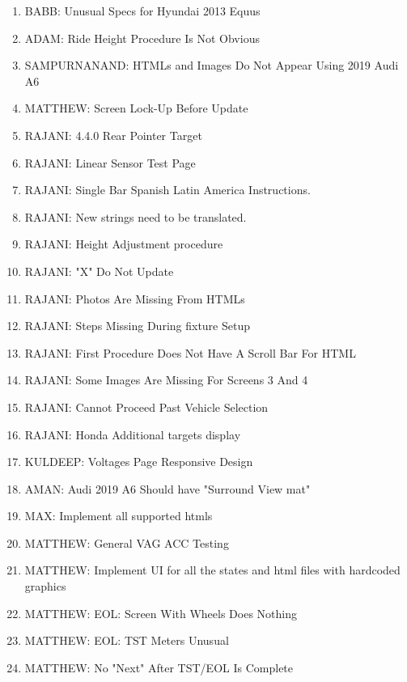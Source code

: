 \normalsize
\begin{enumerate}[leftmargin=!,labelindent=5pt,itemindent=-35pt]
\item {} BABB: Unusual Specs for Hyundai 2013 Equus
\item {} ADAM: Ride Height Procedure Is Not Obvious
\item {} SAMPURNANAND: HTMLs and Images Do Not Appear Using 2019 Audi A6
\item {} MATTHEW: Screen Lock-Up Before Update
\item {} RAJANI: 4.4.0 Rear Pointer Target
\item {} RAJANI: Linear Sensor Test Page
\item {} RAJANI: Single Bar Spanish Latin America Instructions.
\item {} RAJANI: New strings need to be translated.
\item {} RAJANI: Height Adjustment procedure
\item {} RAJANI: "X" Do Not Update
\item {} RAJANI: Photos Are Missing From HTMLs
\item {} RAJANI: Steps Missing During fixture Setup
\item {} RAJANI: First Procedure Does Not Have A Scroll Bar For HTML
\item {} RAJANI: Some Images Are Missing For Screens 3 And 4
\item {} RAJANI: Cannot Proceed Past Vehicle Selection
\item {} RAJANI: Honda Additional targets display
\item {} KULDEEP: Voltages Page Responsive Design
\item {} AMAN: Audi 2019 A6 Should have "Surround View mat"
\item {} MAX: Implement all supported htmls
\item {} MATTHEW: General VAG ACC Testing
\item {} MATTHEW: Implement UI for all the states and html files with hardcoded graphics
\item {} MATTHEW: EOL: Screen With Wheels Does Nothing
\item {} MATTHEW: EOL: TST Meters Unusual
\item {} MATTHEW: No "Next" After TST/EOL Is Complete

\end{enumerate}
